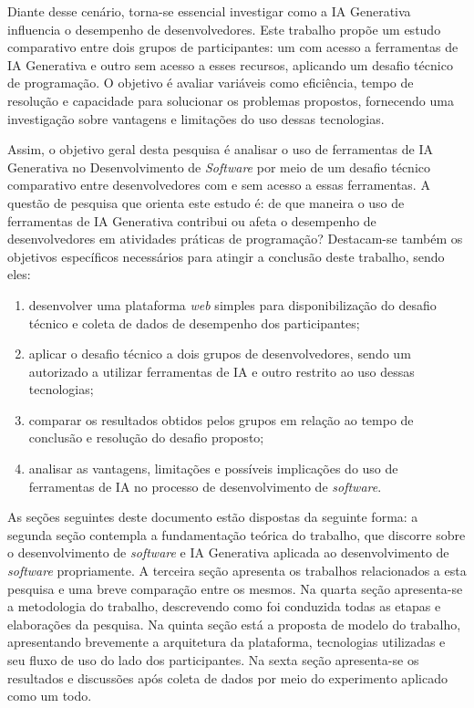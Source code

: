 \documentclass[english,brazilian]{UNISINOSartigo} %
\begin{document}
Diante desse cenário, torna-se essencial investigar como a IA Generativa influencia o desempenho de desenvolvedores. Este trabalho propõe um estudo comparativo entre dois grupos de participantes: um com acesso a ferramentas de IA Generativa e outro sem acesso a esses recursos, aplicando um desafio técnico de programação. O objetivo é avaliar variáveis como eficiência, tempo de resolução e capacidade para solucionar os problemas propostos, fornecendo uma investigação sobre vantagens e limitações do uso dessas tecnologias.

Assim, o objetivo geral desta pesquisa é analisar o uso de ferramentas de IA Generativa no Desenvolvimento de \textit{Software} por meio de um desafio técnico comparativo entre desenvolvedores com e sem acesso a essas ferramentas. A questão de pesquisa que orienta este estudo é: de que maneira o uso de ferramentas de IA Generativa contribui ou afeta o desempenho de desenvolvedores em atividades práticas de programação? Destacam-se também os objetivos específicos necessários para atingir a conclusão deste trabalho, sendo eles:

\begin{enumerate}[label=\alph*), leftmargin=1.2cm, itemsep=0.1em, topsep=0.1em]
    \item desenvolver uma plataforma \textit{web} simples para disponibilização do desafio técnico e coleta de dados de desempenho dos participantes;
    \item aplicar o desafio técnico a dois grupos de desenvolvedores, sendo um autorizado a utilizar ferramentas de IA e outro restrito ao uso dessas tecnologias;
    \item comparar os resultados obtidos pelos grupos em relação ao tempo de conclusão e resolução do desafio proposto;
    \item analisar as vantagens, limitações e possíveis implicações do uso de ferramentas de IA no processo de desenvolvimento de \textit{software}.
\end{enumerate}

As seções seguintes deste documento estão dispostas da seguinte forma: a segunda seção contempla a fundamentação teórica do trabalho, que discorre sobre o desenvolvimento de \textit{software} e IA Generativa aplicada ao desenvolvimento de \textit{software} propriamente. A terceira seção apresenta os trabalhos relacionados a esta pesquisa e uma breve comparação entre os mesmos. Na quarta seção apresenta-se a metodologia do trabalho, descrevendo como foi conduzida todas as etapas e elaborações da pesquisa. Na quinta seção está a proposta de modelo do trabalho, apresentando brevemente a arquitetura da plataforma, tecnologias utilizadas e seu fluxo de uso do lado dos participantes. Na sexta seção apresenta-se os resultados e discussões após coleta de dados por meio do experimento aplicado como um todo.
\end{document}
